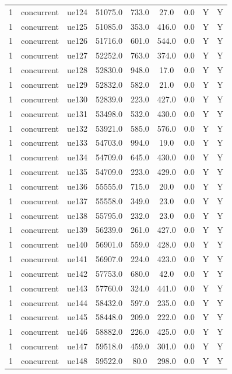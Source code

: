 \begin{table}[ht]
\begin{tabular}{|c|c|c|c|c|c|c|c|c|}
1 & concurrent & ue124 & 51075.0 & 733.0 & 27.0 & 0.0 & Y & Y \\
1 & concurrent & ue125 & 51085.0 & 353.0 & 416.0 & 0.0 & Y & Y \\
1 & concurrent & ue126 & 51716.0 & 601.0 & 544.0 & 0.0 & Y & Y \\
1 & concurrent & ue127 & 52252.0 & 763.0 & 374.0 & 0.0 & Y & Y \\
1 & concurrent & ue128 & 52830.0 & 948.0 & 17.0 & 0.0 & Y & Y \\
1 & concurrent & ue129 & 52832.0 & 582.0 & 21.0 & 0.0 & Y & Y \\
1 & concurrent & ue130 & 52839.0 & 223.0 & 427.0 & 0.0 & Y & Y \\
1 & concurrent & ue131 & 53498.0 & 532.0 & 430.0 & 0.0 & Y & Y \\
1 & concurrent & ue132 & 53921.0 & 585.0 & 576.0 & 0.0 & Y & Y \\
1 & concurrent & ue133 & 54703.0 & 994.0 & 19.0 & 0.0 & Y & Y \\
1 & concurrent & ue134 & 54709.0 & 645.0 & 430.0 & 0.0 & Y & Y \\
1 & concurrent & ue135 & 54709.0 & 223.0 & 429.0 & 0.0 & Y & Y \\
1 & concurrent & ue136 & 55555.0 & 715.0 & 20.0 & 0.0 & Y & Y \\
1 & concurrent & ue137 & 55558.0 & 349.0 & 23.0 & 0.0 & Y & Y \\
1 & concurrent & ue138 & 55795.0 & 232.0 & 23.0 & 0.0 & Y & Y \\
1 & concurrent & ue139 & 56239.0 & 261.0 & 427.0 & 0.0 & Y & Y \\
1 & concurrent & ue140 & 56901.0 & 559.0 & 428.0 & 0.0 & Y & Y \\
1 & concurrent & ue141 & 56907.0 & 224.0 & 423.0 & 0.0 & Y & Y \\
1 & concurrent & ue142 & 57753.0 & 680.0 & 42.0 & 0.0 & Y & Y \\
1 & concurrent & ue143 & 57760.0 & 324.0 & 441.0 & 0.0 & Y & Y \\
1 & concurrent & ue144 & 58432.0 & 597.0 & 235.0 & 0.0 & Y & Y \\
1 & concurrent & ue145 & 58448.0 & 209.0 & 222.0 & 0.0 & Y & Y \\
1 & concurrent & ue146 & 58882.0 & 226.0 & 425.0 & 0.0 & Y & Y \\
1 & concurrent & ue147 & 59518.0 & 459.0 & 301.0 & 0.0 & Y & Y \\
1 & concurrent & ue148 & 59522.0 & 80.0 & 298.0 & 0.0 & Y & Y \\

\end{tabular}
\end{table}
